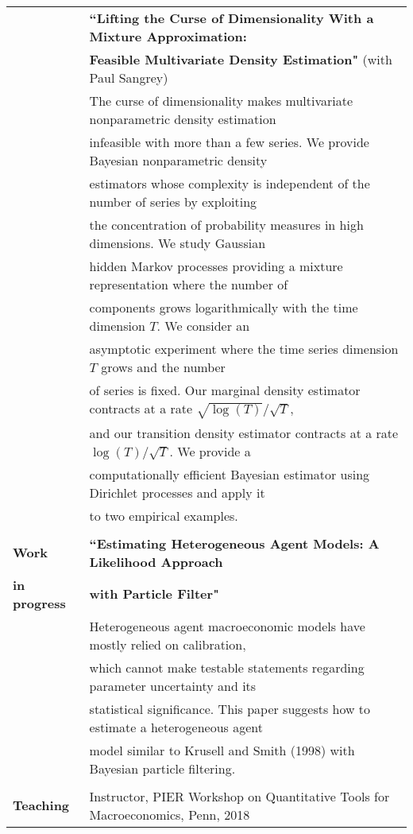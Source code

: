 \documentclass[letterpaper,11pt,oneside]{article}
\begin{document}
\noindent \begin{tabular}{@{} l l}
 & \textbf{``Lifting the Curse of Dimensionality With a Mixture Approximation:}\\
 &\textbf{Feasible Multivariate Density Estimation"} (with Paul Sangrey)\\[0.05in]
 & The curse of dimensionality makes multivariate nonparametric density estimation\\
 & infeasible with more than a few series. We provide Bayesian nonparametric density\\
 & estimators whose complexity is independent of the number of series by exploiting\\
 & the concentration of probability measures in high dimensions. We study Gaussian\\
 & hidden Markov processes providing a mixture representation where the number of\\
 & components grows logarithmically with the time dimension $T$. We consider an\\
 & asymptotic experiment where the time series dimension $T$ grows and the number\\
 & of series is fixed. Our marginal density estimator contracts at a rate $\sqrt{\log(T)}/\sqrt{T}$,\\ & and our transition density estimator contracts at a rate $\log(T)/\sqrt{T}$. We provide a \\ & computationally efficient Bayesian estimator using Dirichlet processes and apply it \\ & to two empirical examples.\\[0.1in]
    & \\
 \large{\textbf{Work}}  & \textbf{``Estimating Heterogeneous Agent Models:
A Likelihood Approach}\\
 \large{\textbf{in progress}}& \textbf{with Particle Filter"}\\[0.05in]
& Heterogeneous agent macroeconomic models have mostly relied on calibration,\\
&which cannot make testable statements regarding
parameter uncertainty and its \\
&statistical significance. This paper suggests how to estimate a
heterogeneous agent\\
& model similar to Krusell and Smith (1998) with Bayesian
particle filtering.\\
     \vspace{0.1in} \\
  \large{\textbf{Teaching}}    &  Instructor, PIER Workshop on Quantitative Tools for Macroeconomics, Penn, 2018\\ 

\end{tabular}
\end{document}

